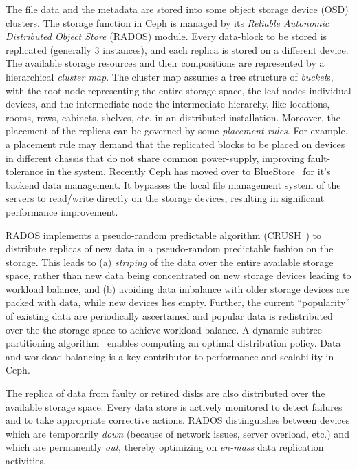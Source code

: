 The file data and the metadata are stored into some object storage device (OSD) clusters. The storage function in Ceph is managed by 
its {\em Reliable Autonomic Distributed Object Store} (RADOS) module.
Every data-block to be stored is replicated (generally 3 instances), and each
replica is stored on a different device. The available storage resources and their compositions are represented by a hierarchical 
{\em cluster map}. The cluster map assumes a tree structure of {\em bucket}s, with the root node representing the entire storage space, 
the leaf nodes individual devices, and the intermediate node the intermediate hierarchy, like locations, rooms, rows, cabinets, shelves, 
etc. in an distributed installation. Moreover, the placement of the replicas can be governed by some {\em placement rules}. For example, 
a placement rule may demand that the replicated blocks to be placed on devices in different chassis that do not share common power-supply, 
improving fault-tolerance in the system. 
Recently Ceph has moved over to BlueStore~\citep{Aghayev:2020} for it's backend data management. It bypasses the local file management 
system of the servers to read/write directly on the storage devices, resulting in significant performance improvement.

RADOS implements a pseudo-random predictable algorithm (CRUSH~\citep{Weil:2006:2}) to distribute replicas of new data in a 
pseudo-random predictable fashion on the storage. This leads to (a) {\em striping} of the data over the entire available storage space, 
rather than new data being concentrated on new storage devices leading to workload balance, and (b) avoiding data imbalance with older 
storage devices are packed with data, while new devices lies empty. Further, the current ``popularity'' of existing data are periodically 
ascertained and popular data is redistributed over the the storage space to achieve workload balance. A dynamic subtree partitioning 
algorithm~\citep{Weil:2004} enables computing an optimal distribution policy. Data and workload balancing is a key contributor to 
performance and scalability in Ceph. 

The replica of data from faulty or retired disks are also distributed over the available storage space. Every data store is actively 
monitored to detect failures and to take appropriate corrective actions. RADOS distinguishes between devices which are temporarily 
{\em down} (because of network issues, server overload, etc.) and which are permanently {\em out}, thereby optimizing on {\it en-mass} 
data replication activities.

